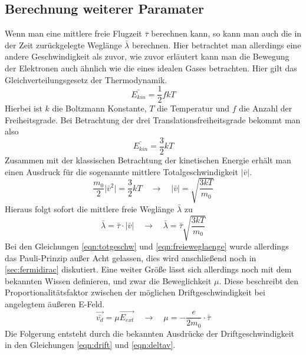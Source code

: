 \subsection{Berechnung weiterer Paramater}
Wenn man eine mittlere freie Flugzeit $\bar{\tau}$ berechnen kann, so kann man auch die in der Zeit zurückgelegte Weglänge $\bar{\lambda}$ berechnen. Hier betrachtet man allerdings
eine andere Geschwindigkeit als zuvor, wie zuvor erläutert kann man die Bewegung der Elektronen auch ähnlich wie die eines idealen Gases betrachten. 
Hier gilt das Gleichverteilungsgesetz der Thermodynamik.
\begin{equation}
\bar{E_{kin}} = \frac{1}{2} f k T
\end{equation}
Hierbei ist $k$ die Boltzmann Konstante, $T$ die Temperatur und $f$ die Anzahl der Freiheitsgrade. Bei Betrachtung der drei Translationsfreiheitsgrade bekommt man also
\begin{equation}
\bar{E_{kin}} = \frac{3}{2} k T
\end{equation}
Zusammen mit der klassischen Betrachtung der kinetischen Energie erhält man einen Ausdruck für die sogenannte mittlere Totalgeschwindigkeit $\lvert \bar{v} \rvert$.
\begin{equation}
\label{eqn:totgeschw}
\frac{m_{0}}{2} \lvert \bar{v}^{2} \rvert = \frac{3}{2} k T \quad \to \quad \lvert \bar{v} \rvert = \sqrt{\frac{3kT}{m_{0}}}
\end{equation}
Hieraus folgt sofort die mittlere freie Weglänge $\bar{\lambda}$ zu
\begin{equation}
\label{eqn:freieweglaenge}
\bar{\lambda} = \bar{\tau} \cdot \lvert \bar{v} \rvert \quad \to \quad \bar{\lambda} = \bar{\tau} \sqrt{\frac{3kT}{m_{0}}}
\end{equation}
Bei den Gleichungen \eqref{eqn:totgeschw} und \eqref{eqn:freieweglaenge} wurde allerdings das Pauli-Prinzip außer Acht gelassen, dies wird anschließend noch in \ref{sec:fermidirac}
diskutiert. Eine weiter Größe lässt sich allerdings noch mit dem bekannten Wissen definieren, und zwar die Beweglichkeit $\mu$. Diese beschreibt den Proportionalitätsfaktor zwischen
der möglichen Driftgeschwindigkeit bei angelegtem äußeren E-Feld.
\begin{equation}
\vec{\bar{v_{d}}} = \mu \vec{E_{ext}} \quad \to \quad \mu = - \frac{e}{2 m_{0}} \cdot \bar{\tau} 
\end{equation}
Die Folgerung entsteht durch die bekannten Ausdrücke der Driftgeschwindigkeit in den Gleichungen \eqref{eqn:drift} und \eqref{eqn:deltav}.

